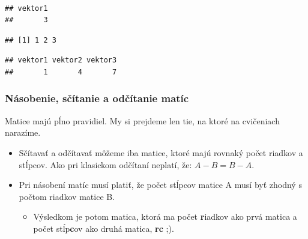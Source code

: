 ~

\begin{Shaded}
\begin{Highlighting}[]

\NormalTok{matica_riadky[}\NormalTok{, }\NormalTok{] }
\end{Highlighting}
\end{Shaded}

\begin{verbatim}
## vektor1 
##       3
\end{verbatim}

\begin{Shaded}
\begin{Highlighting}[]
\NormalTok{matica_riadky[}\NormalTok{, ] }
\end{Highlighting}
\end{Shaded}

\begin{verbatim}
## [1] 1 2 3
\end{verbatim}

\begin{Shaded}
\begin{Highlighting}[]
\NormalTok{matica_riadky[ , }\NormalTok{] }
\end{Highlighting}
\end{Shaded}

\begin{verbatim}
## vektor1 vektor2 vektor3 
##       1       4       7
\end{verbatim}

\hypertarget{nuxe1sobenie-sux10duxedtanie-a-odux10duxedtanie-matuxedc}{%
\subsubsection{Násobenie, sčítanie a odčítanie
matíc}\label{nuxe1sobenie-sux10duxedtanie-a-odux10duxedtanie-matuxedc}}

Matice majú pĺno pravidiel. My si prejdeme len tie, na ktoré na
cvičeniach narazíme.

\begin{itemize}
\tightlist
\item
  Sčítavať a odčítavať môžeme iba matice, ktoré majú rovnaký počet
  riadkov a stĺpcov. Ako pri klasickom odčítaní neplatí, že:
  \(A - B = B - A\).
\item
  Pri násobení matíc musí platiť, že počet stĺpcov matice A musí byť
  zhodný s počtom riadkov matice B.

  \begin{itemize}
  \tightlist
  \item
    Výsledkom je potom matica, ktorá ma počet \textbf{r}iadkov ako prvá
    matica a počet stĺp\textbf{c}ov ako druhá matica, \textbf{rc} ;).
  \end{itemize}
\end{itemize}

